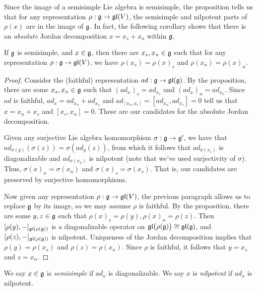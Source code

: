  Since the image of a semisimple Lie algebra is semisimple, the proposition tells us
 that for any representation $\rho:\mathfrak{g}\to \mathfrak{gl}(V)$, the semisimple and nilpotent parts
 of $\rho(x)$ are in the image of $\mathfrak{g}$. In fact, the following corollary shows that
 there is an \emph{absolute} Jordan decomposition
 $x=x_s+x_n$ within $\mathfrak{g}$.
 \begin{corollary}\label{lec13CorJordan}
   If $\mathfrak{g}$ is semisimple, and $x\in \mathfrak{g}$, then there are $x_s,x_n\in \mathfrak{g}$ such that for
   any representation $\rho:\mathfrak{g}\to \mathfrak{gl}(V)$, we have $\rho(x_s)=\rho(x)_s$ and
   $\rho(x_n)=\rho(x)_n$.
 \end{corollary}
 \begin{proof}
   Consider the (faithful) representation $ad:\mathfrak{g}\to \mathfrak{gl}(\mathfrak{g})$. By the proposition,
   there are some $x_s,x_n\in \mathfrak{g}$ such that $(ad_x)_s=ad_{x_s}$ and
   $(ad_x)_n=ad_{x_n}$. Since $ad$ is faithful, $ad_x=ad_{x_n}+ad_{x_s}$ and
   $ad_{[x_n,x_s]}=[ad_{x_n},ad_{x_s}]=0$ tell us that $x=x_n+x_s$ and $[x_s,x_n]=0$.
   These are our candidates for the absolute Jordan decomposition.

   Given any surjective Lie algebra homomorphism $\sigma:\mathfrak{g}\to \mathfrak{g}'$, we have that
   $ad_{\sigma(y)}(\sigma(z))=\sigma(ad_y(z))$, from which it follows that
   $ad_{\sigma(x_s)}$ is diagonalizable and $ad_{\sigma(x_n)}$ is nilpotent (note that
   we've used surjectivity of $\sigma$). Thus, $\sigma(x)_n = \sigma(x_n)$ and
   $\sigma(x)_s=\sigma(x_s)$. That is, our candidates are preserved by surjective
   homomorphisms.

   Now given any representation $\rho:\mathfrak{g}\to \mathfrak{gl}(V)$, the previous paragraph allows us
   to replace $\mathfrak{g}$ by its image, so we may assume $\rho$ is faithful. By the
   proposition, there are some $y,z\in \mathfrak{g}$ such that $\rho(x)_s=\rho(y),
   \rho(x)_n=\rho(z)$. Then $[\rho(y),-]_{\mathfrak{gl}(\rho(\mathfrak{g}))}$ is a diagonalizable operator
   on $\mathfrak{gl}\bigl(\rho(\mathfrak{g})\bigr) \cong \mathfrak{gl}(\mathfrak{g})$, and $[\rho(z),-]_{\mathfrak{gl}(\rho(\mathfrak{g}))}$ is
   nilpotent. Uniqueness of the Jordan decomposition implies that $\rho(y)=\rho(x_s)$
   and $\rho(z)=\rho(x_n)$. Since $\rho$ is faithful, it follows that $y=x_s$ and
   $z=x_n$.
 \end{proof}
 \begin{definition}
   We say $x\in \mathfrak{g}$ is \emph{semisimple} if $ad_x$ is diagonalizable. We say $x$ is
   \emph{nilpotent} if $ad_x$ is nilpotent.
 \end{definition}
